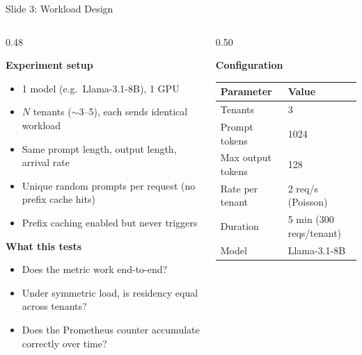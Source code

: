 \documentclass[aspectratio=169,11pt]{beamer}
\begin{document}
\begin{frame}{Slide 3: Workload Design}
\vspace{-0.2em}
\begin{columns}[T]
\begin{column}{0.48\textwidth}

\textbf{Experiment setup}

\vspace{0.2em}
{\scriptsize
\begin{itemize}\setlength{\itemsep}{0.2em}
    \item 1 model (e.g.\ Llama-3.1-8B), 1 GPU
    \item $N$ tenants ($\sim$3--5), each sends identical workload
    \item Same prompt length, output length, arrival rate
    \item Unique random prompts per request (no prefix cache hits)
    \item Prefix caching enabled but never triggers
\end{itemize}
}

\vspace{0.3em}
\textbf{What this tests}

\vspace{0.1em}
{\scriptsize
\begin{itemize}\setlength{\itemsep}{0.15em}
    \item Does the metric work end-to-end?
    \item Under symmetric load, is residency equal across tenants?
    \item Does the Prometheus counter accumulate correctly over time?
\end{itemize}
}

\end{column}
\begin{column}{0.50\textwidth}

\textbf{Configuration}

\vspace{0.2em}
{\scriptsize
\begin{tabular}{@{}ll@{}}
\toprule
\textbf{Parameter} & \textbf{Value} \\
\midrule
Tenants & 3 \\
Prompt tokens & 1024 \\
Max output tokens & 128 \\
Rate per tenant & 2 req/s (Poisson) \\
Duration & 5 min (300 reqs/tenant) \\
Model & Llama-3.1-8B \\
\bottomrule
\end{tabular}
}


\end{column}
\end{columns}
\end{frame}
\end{document}
